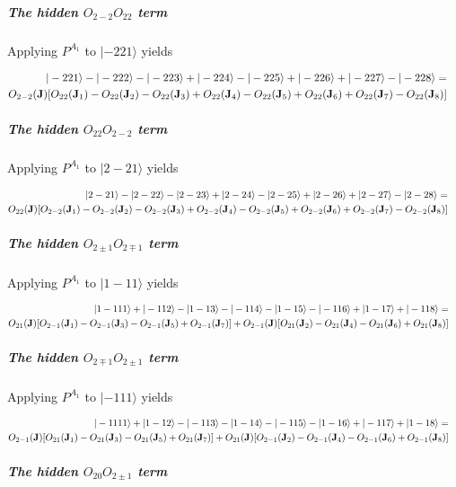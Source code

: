  \subparagraph{The hidden $O_{2-2}O_{22}$ term}

Applying $P^{A_1}$ to $|-221\rangle$ yields 

\begin{eqnarray}
|-221\rangle-|-222\rangle-|-223\rangle+|-224\rangle
-|-225\rangle+|-226\rangle+|-227\rangle-|-228\rangle  =&& \\ \nonumber
O_{2-2}(\mathbf J)[
 O_{22}(\mathbf J_1)-O_{22}(\mathbf J_2)-O_{22}(\mathbf J_3)+O_{22}(\mathbf J_4)
-O_{22}(\mathbf J_5)+O_{22}(\mathbf J_6)+O_{22}(\mathbf J_7)-O_{22}(\mathbf J_8)
]&&
\end{eqnarray}

 \subparagraph{The hidden $O_{22}O_{2-2}$ term}

Applying $P^{A_1}$ to $|2-21\rangle$ yields 

\begin{eqnarray}
|2-21\rangle-|2-22\rangle-|2-23\rangle+|2-24\rangle
-|2-25\rangle+|2-26\rangle+|2-27\rangle-|2-28\rangle  =&& \\ \nonumber
O_{22}(\mathbf J)[
 O_{2-2}(\mathbf J_1)-O_{2-2}(\mathbf J_2)-O_{2-2}(\mathbf J_3)+O_{2-2}(\mathbf J_4)
-O_{2-2}(\mathbf J_5)+O_{2-2}(\mathbf J_6)+O_{2-2}(\mathbf J_7)-O_{2-2}(\mathbf J_8)
]&&
\end{eqnarray}



\subparagraph{The hidden $O_{2\pm1}O_{2\mp1}$ term}

Applying $P^{A_1}$ to $|1-11\rangle$ yields 

\begin{eqnarray}
|1-111\rangle+|-112\rangle-|1-13\rangle-|-114\rangle
-|1-15\rangle-|-116\rangle+|1-17\rangle+|-118\rangle =&&\\ \nonumber
O_{21}(\mathbf J)
[O_{2-1}(\mathbf J_1)-O_{2-1}(\mathbf J_3)-O_{2-1}(\mathbf J_5)+O_{2-1}(\mathbf J_7)]
+O_{2-1}(\mathbf J)
[O_{21}(\mathbf J_2)-O_{21}(\mathbf J_4)-O_{21}(\mathbf J_6)+O_{21}(\mathbf J_8)]&&
\end{eqnarray}

\subparagraph{The hidden $O_{2\mp1}O_{2\pm1}$ term}

Applying $P^{A_1}$ to $|-111\rangle$ yields 

\begin{eqnarray}
|-1111\rangle+|1-12\rangle-|-113\rangle-|1-14\rangle
-|-115\rangle-|1-16\rangle+|-117\rangle+|1-18\rangle =&&\\ \nonumber
O_{2-1}(\mathbf J)
[O_{21}(\mathbf J_1)-O_{21}(\mathbf J_3)-O_{21}(\mathbf J_5)+O_{21}(\mathbf J_7)]
+O_{21}(\mathbf J)
[O_{2-1}(\mathbf J_2)-O_{2-1}(\mathbf J_4)-O_{2-1}(\mathbf J_6)+O_{2-1}(\mathbf J_8)]&&
\end{eqnarray}

\subparagraph{The hidden $O_{20}O_{2\pm1}$ term}

